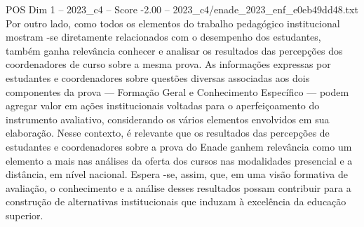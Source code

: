 \begin{textsample}{POS Dim 1 – 2023\_c4 – Score -2.00 – 2023\_c4/enade\_2023\_enf\_e0eb49dd48.txt}
Por outro lado, como todos os elementos do trabalho pedagógico institucional mostram -se diretamente relacionados com o desempenho dos estudantes, também ganha relevância conhecer e analisar os resultados das percepções dos coordenadores de curso sobre a mesma prova.
As informações expressas por estudantes e coordenadores sobre questões diversas associadas aos dois componentes da prova — Formação Geral e Conhecimento Específico — podem agregar valor em ações institucionais voltadas para o aperfeiçoamento do instrumento avaliativo, considerando os vários elementos envolvidos em sua elaboração.
Nesse contexto, é relevante que os resultados das percepções de estudantes e coordenadores sobre a prova do Enade ganhem relevância como um elemento a mais nas análises da oferta dos cursos nas modalidades presencial e a distância, em nível nacional.
Espera -se, assim, que, em uma visão formativa de avaliação, o conhecimento e a análise desses resultados possam contribuir para a construção de alternativas institucionais que induzam à excelência da educação superior.

\end{textsample}
